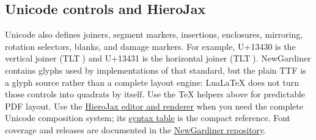\documentclass[11pt]{article}
\newcommand{\egypt}[1]{{\leavevmode\textdir TLT\NewGardinerFont #1}}
\begin{document}
\begin{center}


\end{center}



\subsection*{Unicode controls and HieroJax}

Unicode also defines joiners, segment markers, insertions, enclosures,
mirroring, rotation selectors, blanks, and damage markers.  For example,
U+13430 is the vertical joiner (\egypt{𓐰}) and U+13431 is the horizontal
joiner (\egypt{𓐱}).  NewGardiner contains glyphs used by implementations of
that standard, but the plain TTF is a glyph source rather than a complete
layout engine: LuaLaTeX does not turn those controls into quadrats by itself.
Use the TeX helpers above for predictable PDF layout.  Use the
\href{https://nederhof.github.io/hierojax/}{HieroJax editor and renderer} when
you need the complete Unicode composition system; its
\href{https://nederhof.github.io/hierojax/syntax.html}{syntax table} is the
compact reference.  Font coverage and releases are documented in the
\href{https://github.com/nederhof/newgardiner}{NewGardiner repository}.
\end{document}
